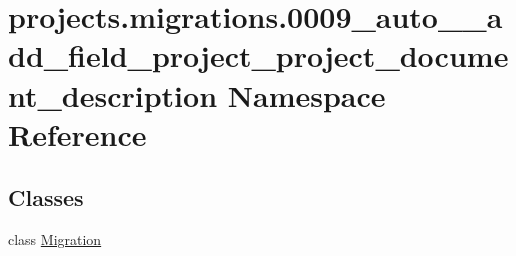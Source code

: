 \hypertarget{namespaceprojects_1_1migrations_1_10009__auto____add__field__project__project__document__description}{\section{projects.\-migrations.0009\-\_\-auto\-\_\-\-\_\-add\-\_\-field\-\_\-project\-\_\-project\-\_\-document\-\_\-description Namespace Reference}
\label{namespaceprojects_1_1migrations_1_10009__auto____add__field__project__project__document__description}
}
\subsection*{Classes}
\begin{DoxyCompactItemize}
\item 
class \hyperlink{classprojects_1_1migrations_1_10009__auto____add__field__project__project__document__description_1_1_migration}{Migration}
\end{DoxyCompactItemize}
